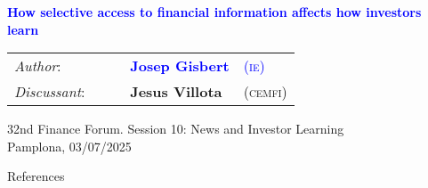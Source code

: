 \documentclass{beamer}
\title[Discussion]{}
\author[Jesus Villota]{}
\institute[cemfi]{}
\date[July 4, 2024]{}
\begin{document}
\begin{frame}[plain]
  \centering
  {\LARGE \textbf{\textcolor{blue}{How selective access to financial information affects how investors learn}}
  \par}

  \vspace{1.2cm}
  \begin{tabular}{l|ll}
    \textit{Author}: ~~&~ \textcolor{blue}{\textbf{Josep Gisbert}} & \textcolor{blue}{(\textsc{ie})} \\[1em]
    \textit{Discussant}: ~~&~ \textbf{Jesus Villota} &(\textsc{cemfi})
  \end{tabular}

  \vspace{1.2cm}
  \small{
  32nd Finance Forum. Session 10: News and Investor Learning
  \\ \medskip 
  Pamplona, 03/07/2025
  }
\end{frame}






% 

\begin{frame}[allowframebreaks]{References}
  
\end{frame}
\end{document}
